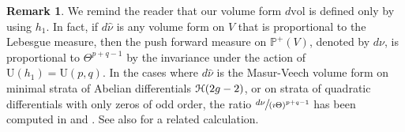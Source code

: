 \documentclass[11pt]{article}
\numberwithin{equation}{section}
\let\mathcal\EuScript
\theoremstyle{plain}
\theoremstyle{definition}
\newtheorem{Remark}[Theorem]{Remark}
\newcommand{\Pb}{\mathbb{P}}
\newcommand{\cH}{\mathcal{H}}
\newcommand{\vol}{\mathrm{vol}}
\newcommand{\Ur}{\mathrm{U}}
\begin{document}
\begin{Remark}\label{rk:push:meas:n:curvature}
We remind the reader that our volume form $d\vol$ is defined only by using $h_1$.
In fact, if $d\hat{\nu}$ is any volume form on $V$ that is proportional to the Lebesgue measure, then the push forward measure on $\Pb^+(V)$, denoted by $d\nu$, is proportional to $\Theta^{p+q-1}$ by the invariance under the action of $\Ur(h_1)=\Ur(p,q)$.
In the cases where $d\hat{\nu}$ is the Masur-Veech volume form on minimal strata of Abelian differentials $\cH(2g-2)$, or on strata of quadratic differentials with only zeros of odd order, the ratio $\sfrac{d\nu}{(\imath\Theta)^{p+q-1}}$ has been computed in \cite{Sau18} and \cite{CMS19}.
See also \cite[Lem.\,5.1]{Sau20} for a related calculation.
\end{Remark}
\end{document}

